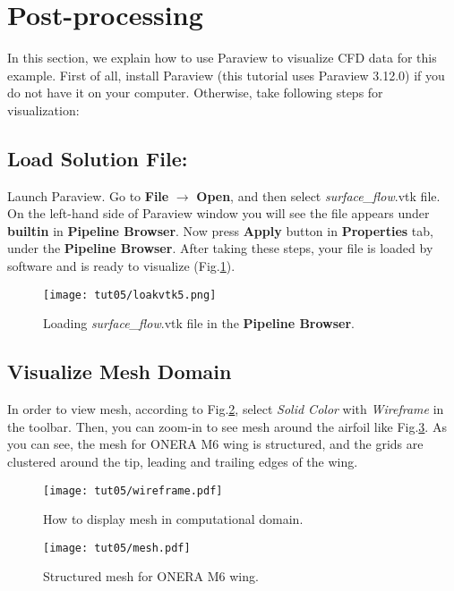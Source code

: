 \section{Post-processing}
In this section, we explain how to use Paraview to visualize CFD data for this example. First of all, install Paraview (this tutorial uses Paraview 3.12.0) if you do not have it on your computer. Otherwise, take following steps for visualization:
\subsection{Load Solution File:}
Launch Paraview. Go to \textbf{File} $\rightarrow$ \textbf{Open}, and then select \textit{surface\_flow}.vtk file. On the left-hand side of Paraview window you will see the file appears under \textbf{builtin} in \textbf{Pipeline Browser}. Now press \textbf{Apply} button in \textbf{Properties} tab, under the  \textbf{Pipeline Browser}. After taking these steps, your file is loaded by software and is ready to visualize (Fig.\ref{fig5:load}).
\begin{figure}[htbp]
    \centering
    \texttt{[image: tut05/loakvtk5.png]}
    \caption{Loading \textit{surface\_flow}.vtk file in the \textbf{Pipeline Browser}.}
    \label{fig5:load}
\end{figure}
\subsection{Visualize Mesh Domain}
In order to view mesh, according to Fig.\ref{fig5:wireframe}, select \textit{Solid Color} with \textit{Wireframe} in the toolbar. Then, you can zoom-in to see mesh around the airfoil like Fig.\ref{fig5:mesh}. As you can see, the mesh for ONERA M6 wing is structured, and the grids are clustered around the tip, leading and trailing edges of the wing.
\begin{figure}[htbp]
    \centering
    \texttt{[image: tut05/wireframe.pdf]}
    \caption{How to display mesh in computational domain.}
    \label{fig5:wireframe}
\end{figure}
\begin{figure}[htbp]
    \centering
    \texttt{[image: tut05/mesh.pdf]}
    \caption{Structured mesh for ONERA M6 wing.}
    \label{fig5:mesh}
\end{figure}
